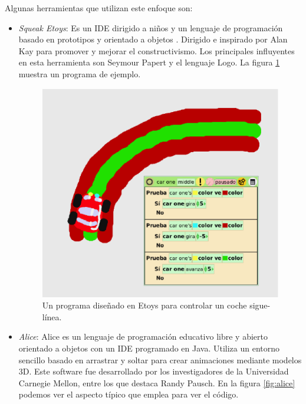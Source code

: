 \documentclass{llncs}
\begin{document}
Algunas herramientas que utilizan este enfoque son:
\begin{itemize}
\item {\em Squeak Etoys}: Es un IDE dirigido a niños y un lenguaje de programación basado en prototipos y orientado a objetos \cite{etoysOnline}. Dirigido e inspirado por Alan Kay para promover y mejorar el constructivismo. Los principales influyentes en esta herramienta son Seymour Papert y el lenguaje Logo. La figura \ref{fig:etoys} muestra un programa de ejemplo.


\begin{figure}[ht]
\begin{center}
\includegraphics[scale=0.4]{images/etoys.eps}
\caption{Un programa diseñado en Etoys para controlar un coche sigue-línea.
\label{fig:etoys}}
\end{center}
\end{figure}

\item {\em Alice}: Alice \cite{AliceOnline} es un lenguaje de programación educativo libre y abierto orientado a objetos con un IDE programado en Java. Utiliza un entorno sencillo basado en arrastrar y soltar para crear animaciones mediante modelos 3D. Este software fue desarrollado por los investigadores de la Universidad Carnegie Mellon, entre los que destaca Randy Pausch. En la figura \ref{fig:alice} podemos ver el aspecto típico que emplea para ver el código.


\end{itemize}
\end{document}
